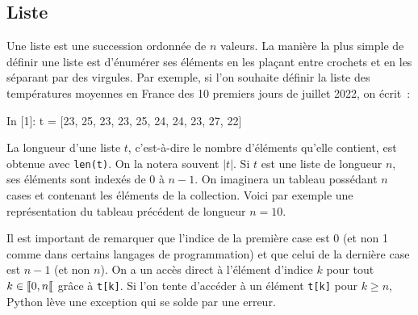 \documentclass{magnolia}
\begin{document}
\subsection{Liste}

Une liste est une succession ordonnée de $n$ valeurs. La manière la plus simple de définir une
liste est d'énumérer ses éléments en les plaçant entre crochets et en les séparant par des virgules.
Par exemple, si l'on souhaite définir la liste des températures moyennes en France des 10 premiers jours
de juillet 2022, on écrit~:

\begin{pythoncode}
In [1]: t = [23, 25, 23, 23, 25, 24, 24, 23, 27, 22]
\end{pythoncode}
\noindent
La longueur d'une liste $t$, c'est-à-dire le nombre d'éléments qu'elle contient,
est obtenue avec \verb!len(t)!. On la notera souvent $|t|$. Si $t$ est une liste de longueur
$n$, ses éléments sont indexés de 0 à $n-1$. On imaginera un tableau possédant $n$ cases
et contenant les éléments de la collection. Voici par exemple une représentation du tableau
précédent de longueur $n=10$.
\begin{center}
\end{center}
Il est important de remarquer que l'indice de la première case est 0 (et non 1 comme dans certains langages de programmation) et que celui de la
dernière case est $n-1$ (et non $n$). On a un accès direct à l'élément d'indice $k$ 
pour tout $k\in\left\llbracket 0,n\right\llbracket$ grâce à \verb!t[k]!. Si l'on tente d'accéder à un élément \verb!t[k]! pour $k\geq n$,
Python lève une exception qui se solde par une erreur.\\
\end{document}
